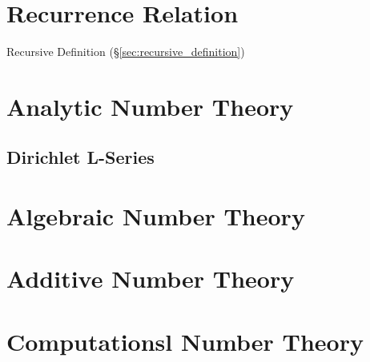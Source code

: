 \section{Recurrence Relation}\label{sec:recurrence_relation}

Recursive Definition (\S\ref{sec:recursive_definition})



\section{Analytic Number Theory}\label{sec:analytic_number_theory}

\subsection{Dirichlet L-Series}\label{sec:l_series}



\section{Algebraic Number Theory}\label{sec:algebraic_number_theory}

\section{Additive Number Theory}\label{sec:additive_number_theory}

\section{Computationsl Number Theory}\label{sec:computational_number_theory}

